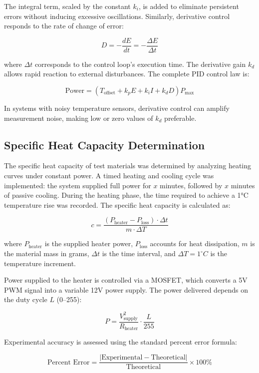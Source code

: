 The integral term, scaled by the constant $k_i$, is added to eliminate
persistent errors without inducing excessive oscillations.
Similarly, derivative control responds to the rate of change of error:

\begin{equation}
    D = -\frac{dE}{dt} = -\frac{\Delta E}{\Delta t}
    \label{eq:derivative}
\end{equation}

where $\Delta t$ corresponds to the control loop's execution time.
The derivative gain $k_d$ allows rapid reaction to external disturbances.
The complete PID control law is:

\begin{equation}
    \text{Power} = \left( T_{\text{offset}} + k_p E + k_i I + k_d D \right) P_{\max}
    \label{eq:power_PID}
\end{equation}

In systems with noisy temperature sensors, derivative control can amplify
measurement noise, making low or zero values of $k_d$ preferable.

\subsection{Specific Heat Capacity Determination}
\label{subsec:specific-heat-capacity-determination}

The specific heat capacity of test materials was determined by analyzing
heating curves under constant power.
A timed heating and cooling cycle was implemented: the system supplied full
power for $x$ minutes, followed by $x$ minutes of passive cooling.
During the heating phase, the time required to achieve a 1°C temperature rise
was recorded.
The specific heat capacity is calculated as:

\begin{equation}
    c = \frac{\left(P_{\text{heater}} - P_{\text{loss}}\right) \cdot \Delta t}{m \cdot \Delta T}
    \label{eq:specific_heat}
\end{equation}

where $P_{\text{heater}}$ is the supplied heater power, $P_{\text{loss}}$
accounts for heat dissipation, $m$ is the material mass in grams, $\Delta t$
is the time interval, and $\Delta T = 1^{\circ}C$ is the temperature increment.

Power supplied to the heater is controlled via a MOSFET, which converts a 5V
PWM signal into a variable 12V power supply.
The power delivered depends on the duty cycle $L$ (0--255):

\begin{equation}
    P = \frac{V^2_{\text{supply}}}{R_{\text{heater}}} \cdot \frac{L}{255}
    \label{eq:power_mosfet}
\end{equation}

Experimental accuracy is assessed using the standard percent error formula:

\begin{equation}
    \text{Percent Error} = \frac{\left|\text{Experimental} - \text{Theoretical}\right|}{\text{Theoretical}} \times 100\%
    \label{eq:percent_error}
\end{equation}